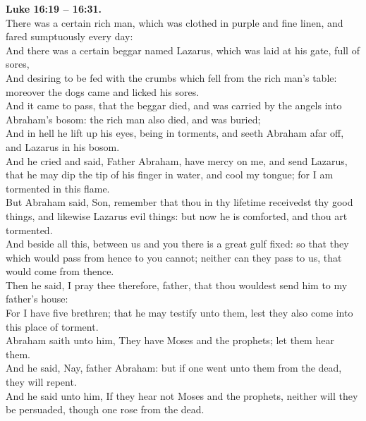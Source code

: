 \documentclass[10pt]{article} %
\begin{document}
{\begin{minipage}[t]{0.45\textwidth}
\textbf{Luke 16:19 -- 16:31.}\\
There was a certain rich man, which was clothed in purple and fine linen, and fared sumptuously every day:\\
And there was a certain beggar named Lazarus, which was laid at his gate, full of sores,\\
And desiring to be fed with the crumbs which fell from the rich man's table: moreover the dogs came and licked his sores.\\
And it came to pass, that the beggar died, and was carried by the angels into Abraham's bosom: the rich man also died, and was buried;\\
And in hell he lift up his eyes, being in torments, and seeth Abraham afar off, and Lazarus in his bosom.\\
And he cried and said, Father Abraham, have mercy on me, and send Lazarus, that he may dip the tip of his finger in water, and cool my tongue; for I am tormented in this flame.\\
But Abraham said, Son, remember that thou in thy lifetime receivedst thy good things, and likewise Lazarus evil things: but now he is comforted, and thou art tormented.\\
And beside all this, between us and you there is a great gulf fixed: so that they which would pass from hence to you cannot; neither can they pass to us, that would come from thence.\\
Then he said, I pray thee therefore, father, that thou wouldest send him to my father's house:\\
For I have five brethren; that he may testify unto them, lest they also come into this place of torment.\\
Abraham saith unto him, They have Moses and the prophets; let them hear them.\\
And he said, Nay, father Abraham: but if one went unto them from the dead, they will repent.\\
And he said unto him, If they hear not Moses and the prophets, neither will they be persuaded, though one rose from the dead.\\
\end{minipage}}
\newpage\huge
\end{document}
